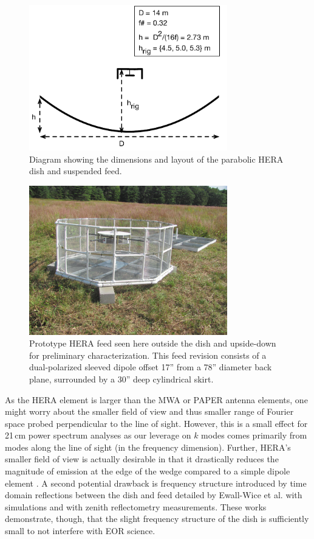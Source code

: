 \documentclass{emulateapj}
\begin{document}
\begin{figure}[h]
\includegraphics[width=3.4in]{dish_and_feed_diagram.pdf}
\caption{Diagram showing the dimensions and layout of the parabolic HERA dish and suspended feed.}
\label{fig:feeddiagram}
\end{figure}

\begin{figure}[h]
\includegraphics[width=3.4in]{feed.jpg}
\caption{Prototype HERA feed seen here outside the dish and upside-down for preliminary characterization. This feed revision consists of a dual-polarized sleeved dipole offset 17'' from a 78'' diameter back plane, surrounded by a 30'' deep cylindrical skirt.}
\label{fig:feedphoto}
\end{figure}

As the HERA element is larger than the MWA or PAPER antenna elements, one might worry about the  smaller field of view and thus smaller range of Fourier space probed perpendicular to the line of sight. However, this is a 
small effect for 21\,cm power spectrum analyses as our leverage on $k$ modes comes primarily from modes along the line of sight (in the frequency dimension). Further, HERA's smaller field of view is actually desirable in that it drastically reduces the magnitude of emission at the edge of the wedge compared to a simple dipole element \citep{nithya15}. A second potential drawback is frequency structure introduced by time domain reflections between the dish and feed detailed by Ewall-Wice et al. \citep{ewallwice16} with simulations and \citep{patra16} with zenith reflectometry measurements. These works demonstrate, though, that the slight frequency structure of the dish is sufficiently small to not interfere with EOR science.
\end{document}
